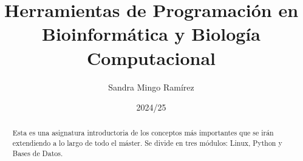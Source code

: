 \documentclass{config/apuntes}
\title{Herramientas de Programación en Bioinformática y Biología Computacional}
\author{Sandra Mingo Ramírez}
\date{2024/25}
\begin{document}
\begin{abstract}
Esta es una asignatura introductoria de los conceptos más importantes que se irán extendiendo a lo largo de todo el máster. Se divide en tres módulos: Linux, Python y Bases de Datos. 
\end{abstract}

\pagestyle{plain}

\maketitle

\tableofcontents




\end{document}
